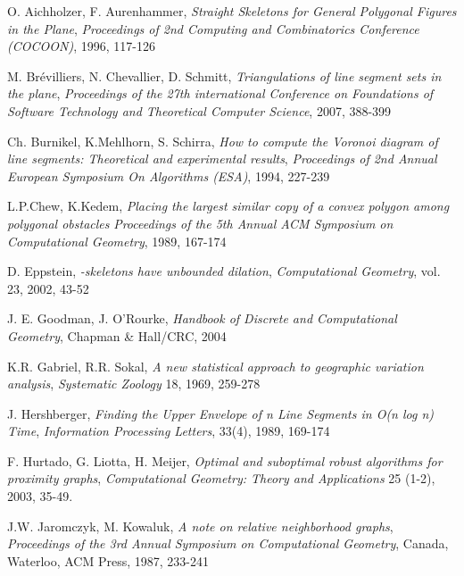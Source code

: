 \documentclass[11pt]{llncs}
\begin{document}
\begin{thebibliography}{50}
O. Aichholzer, F. Aurenhammer,
\textit{Straight Skeletons for General Polygonal Figures in the Plane},
\textit{Proceedings of 2nd Computing and Combinatorics Conference (COCOON)}, 1996, 117-126



M. Br\'{e}villiers, N. Chevallier, D. Schmitt,
\textit{Triangulations of line segment sets in the plane},
\textit{Proceedings of the 27th international Conference on Foundations of Software 
Technology and Theoretical Computer Science}, 2007, 388-399



Ch. Burnikel, K.Mehlhorn, S. Schirra,
\textit{How to compute the Voronoi diagram of line segments: Theoretical and experimental results},
\textit{Proceedings of 2nd Annual European Symposium On Algorithms (ESA)}, 1994, 227-239 

L.P.Chew, K.Kedem,
\textit{Placing the largest similar copy of a convex polygon among polygonal obstacles}
\textit{Proceedings of the 5th Annual ACM Symposium on Computational Geometry}, 1989, 167-174





D. Eppstein, 
\textit{-skeletons have unbounded dilation}, 
\textit{Computational Geometry}, vol. 23, 2002, 43-52

J. E. Goodman, J. O'Rourke, 
\textit{Handbook of Discrete and Computational Geometry}, 
Chapman \& Hall/CRC, 2004

K.R. Gabriel, R.R. Sokal, 
\textit{A new statistical approach to geographic variation analysis}, 
\textit{Systematic Zoology} 18, 1969, 259-278

J. Hershberger, 
\textit{Finding the Upper Envelope of n Line Segments in O(n log n) Time},
\textit{Information Processing Letters}, 33(4), 1989, 169-174

F. Hurtado, G. Liotta, H. Meijer, 
\textit{Optimal and suboptimal robust algorithms for proximity graphs}, 
\textit{Computational Geometry: Theory and Applications} 25 (1-2), 2003, 35-49.

J.W. Jaromczyk, M. Kowaluk, 
\textit{A note on relative neighborhood graphs}, 
\textit{Proceedings of the 3rd Annual Symposium on Computational Geometry}, Canada, Waterloo, 
ACM Press, 1987, 233-241 




\end{thebibliography}
\end{document}
